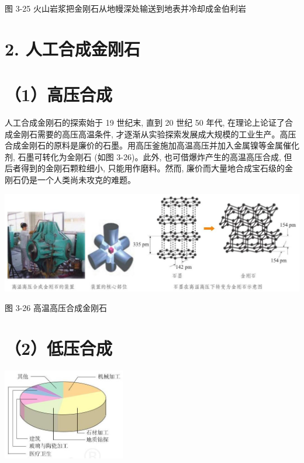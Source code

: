 \documentclass[10pt]{article}
\begin{document}
图 3-25 火山岩浆把金刚石从地幔深处输送到地表并冷却成金伯利岩

\section*{2. 人工合成金刚石}

\section*{（1）高压合成}

人工合成金刚石的探索始于 19 世纪末, 直到 20 世纪 50 年代, 在理论上论证了合成金刚石需要的高压高温条件, 才逐渐从实验探索发展成大规模的工业生产。高压合成金刚石的原料是廉价的石墨。用高压釜施加高温高压并加入金属镍等金属催化剂, 石墨可转化为金刚石 (如图 3-26)。此外, 也可借爆炸产生的高温高压合成, 但后者得到的金刚石颗粒细小, 只能用作磨料。然而, 廉价而大量地合成宝石级的金刚石仍是一个人类尚未攻克的难题。

\begin{center}
\includegraphics[max width=1.0\textwidth]{images/0190e026-5a11-7df7-bd27-54d09026ba7a_87_332605.jpg}
\end{center}

图 3-26 高温高压合成金刚石

\section*{（2）低压合成}

\begin{center}
\includegraphics[max width=0.4\textwidth]{images/0190e026-5a11-7df7-bd27-54d09026ba7a_87_114407.jpg}
\end{center}
\end{document}
